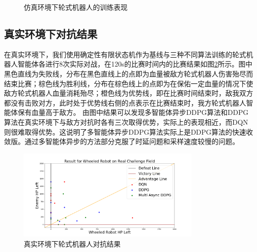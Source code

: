 \begin{figure}[hb]
  \centering
  \caption{仿真环境下轮式机器人的训练表现}\label{performance}
\end{figure}

\subsection{真实环境下对抗结果}
在真实环境下，我们使用确定性有限状态机作为基线与三种不同算法训练的轮式机器人智能体各进行8次实际对战，在120s的比赛时间内的比赛结果如图\ref{result}所示。图中黑色直线为失败线，分布在黑色直线上的点即为血量被敌方轮式机器人伤害殆尽而结束比赛；棕色线为胜利线，分布在棕色线上的点即为在保佑一定血量的情况下使敌方轮式机器人血量消耗殆尽；橙色线为优势线，即在比赛时间结束时，敌我双方都没有击败对方，此时处于优势线右侧的点表示在比赛结束时，我方轮式机器人智能体保有血量高于敌方。
由图中结果可以发现多智能体异步DDPG算法和DDPG算法在真实环境下与敌方对抗时各有三次取得优势，实际上的表现相近，而DQN则很难取得优势。这说明了多智能体异步DDPG算法实际上是DDPG算法的快速收敛版。通过多智能体异步的方法部分克服了时延问题和采样速度较慢的问题。
\begin{figure}[ht]
  \centering
  \includegraphics[width=0.80\textwidth]{figures/result.png}
  \caption{真实环境下轮式机器人对抗结果}\label{result}
\end{figure}

